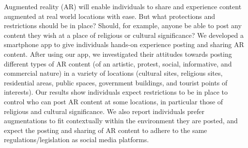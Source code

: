 Augmented reality (AR) will enable individuals to share and experience content augmented at real world locations with ease. 
But what protections and restrictions should be in place? 
Should, for example, anyone be able to post any content they wish at a place of religious or cultural significance? 
We developed a smartphone app to give individuals hands-on experience posting and sharing AR content. 
After using our app, we investigated their attitudes towards posting different types of AR content (of an artistic, protest, social, informative, and commercial nature) in a variety of locations (cultural sites, religious sites, residential areas, public spaces, government buildings, and tourist points of interests). 
Our results show individuals expect restrictions to be in place to control who can post AR content at some locations, in particular those of religious and cultural significance. 
We also report individuals prefer augmentations to fit contextually within the environment they are posted, and expect the posting and sharing of AR content to adhere to the same regulations/legislation as social media platforms. 